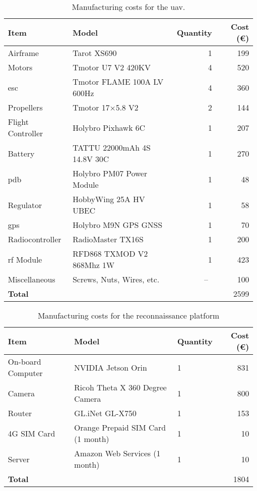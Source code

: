 \begin{table}[H]
  \begin{tabular}{ l l r r }
    \toprule
    \textbf{Item} & \textbf{Model} & \textbf{Quantity} & \textbf{Cost (\euro)} \\
    \midrule
    Airframe & Tarot XS690 \autocite{rcinnovationsQuadPlegable} & 1 & 199 \\
    Motors & Tmotor U7 V2 420KV \autocite{rcinnovationsTmotor420KV} & 4 & 520 \\
    \gls{esc} & Tmotor FLAME 100A LV 600Hz \autocite{rcinnovationsVariadorTmotor} & 4 & 360 \\
    Propellers & Tmotor 17$\times$5.8 V2 \autocite{rcinnovationsTmotor17x58} & 2 & 144 \\
    Flight Controller & Holybro Pixhawk 6C \autocite{rcinnovationsPixhawkCarcasa} & 1 & 207 \\
    Battery & TATTU 22000mAh 4S 14.8V 30C \autocite{rcinnovationsComprarBatera}  & 1 & 270 \\
    \gls{pdb} & Holybro PM07 Power Module \autocite{rcinnovationsHolybroPM07} & 1 & 48 \\
    Regulator & HobbyWing 25A HV UBEC \autocite{rcinnovationsHobbyWingUbec} & 1 & 58 \\
    \gls{gps} & Holybro M9N GPS GNSS \autocite{rcinnovationsHolybroGNSS} & 1 & 70 \\
    Radiocontroller & RadioMaster TX16S \autocite{rcinnovationsRadioMasterTX16S} & 1 & 200 \\
    \gls{rf} Module & RFD868 TXMOD V2 868Mhz 1W \autocite{rcinnovationsComprarMdulos} & 1 & 423 \\
    Miscellaneous & Screws, Nuts, Wires, etc. &~--~& 100 \\
    \midrule
    \textbf{Total} & & & 2599 \\
    \bottomrule
  \end{tabular}
  \caption{Manufacturing costs for the \gls{uav}.}\label{tab:manufacturing_costs_uav}
\end{table}

\begin{table}[H]
  \begin{tabular}{ l l l r }
    \toprule
    \textbf{Item} & \textbf{Model} & \textbf{Quantity} & \textbf{Cost (\euro)} \\
    \midrule
    On-board Computer & NVIDIA Jetson Orin \autocite{nvidiaNVIDIAJetson} & 1 & 831 \\
    Camera & Ricoh Theta X 360 Degree Camera \autocite{ricohimagingTHETARicoh} & 1 & 800 \\
    Router & GL.iNet GL-X750 \autocite{glinetGLX750Spitz} & 1 & 153  \\
    4G SIM Card & Orange Prepaid SIM Card (1 month) & 1 & 10 \\
    Server & Amazon Web Services (1 month) & 1 & 10 \\
    \midrule
    \textbf{Total} & & & 1804 \\
    \bottomrule
  \end{tabular}
  \caption{Manufacturing costs for the reconnaissance platform} \label{tab:manufacturing_costs_reconnaissance_platform}
\end{table}

